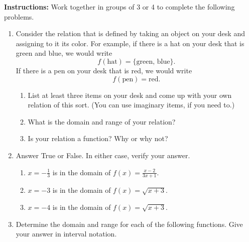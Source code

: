 





\noindent \textbf{Instructions:}  Work together in groups of  3 or 4 to complete the following problems.


\begin{enumerate}

\item Consider the relation that is defined by taking an object on your desk and assigning to it its color.  For example, if there is a hat on your desk that is green and blue, we would write
$$f(\text{hat}) = \{\text{green, blue}\}.$$
If there is a pen on your desk that is red, we would write
$$f(\text{pen}) = \text{red}.$$

\begin{enumerate}
\item List at least three items on your desk and come up with your own relation of this sort. (You can use imaginary items, if you need to.)
\vfil
\item What is the domain and range of your relation?
\vspace{.75in}
\item Is your relation a function?  Why or why not?
\end{enumerate}


\vspace{.5in}

\item Answer True or False.  In either case, verify your answer.

\begin{enumerate}
\item $x=-\frac{1}{3}$ is in the domain of $\displaystyle f(x)=\frac{x-2}{3x+1}$.
\vspace{.5in}
\item $x=-3$ is in the domain of $\displaystyle f(x)=\sqrt{x+3}$.
\vspace{.5in}
\item $x=-4$ is in the domain of $\displaystyle f(x)=\sqrt{x+3}$.
\end{enumerate}

\newpage


\item Determine the domain and range for each of the following functions.  Give your answer in interval notation.
\vspace{-.5in}
\begin{enumerate}


\end{enumerate}
\end{enumerate}
